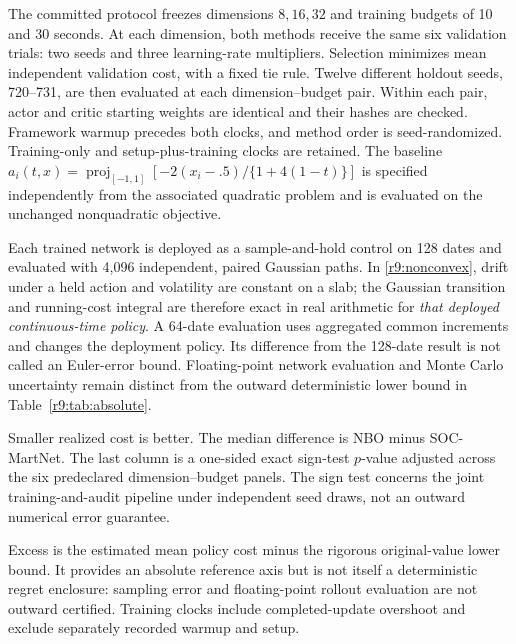The committed protocol freezes dimensions $8,16,32$ and training budgets of 10 and 30 seconds. At each dimension, both methods receive the same six validation trials: two seeds and three learning-rate multipliers. Selection minimizes mean independent validation cost, with a fixed tie rule. Twelve different holdout seeds, 720--731, are then evaluated at each dimension--budget pair. Within each pair, actor and critic starting weights are identical and their hashes are checked. Framework warmup precedes both clocks, and method order is seed-randomized. Training-only and setup-plus-training clocks are retained. The baseline $a_i(t,x)=\operatorname{proj}_{[-1,1]}[-2(x_i-.5)/\{1+4(1-t)\}]$ is specified independently from the associated quadratic problem and is evaluated on the unchanged nonquadratic objective.

Each trained network is deployed as a sample-and-hold control on 128 dates and evaluated with 4,096 independent, paired Gaussian paths. In \eqref{r9:nonconvex}, drift under a held action and volatility are constant on a slab; the Gaussian transition and running-cost integral are therefore exact in real arithmetic for \emph{that deployed continuous-time policy}. A 64-date evaluation uses aggregated common increments and changes the deployment policy. Its difference from the 128-date result is not called an Euler-error bound. Floating-point network evaluation and Monte Carlo uncertainty remain distinct from the outward deterministic lower bound in Table~\ref{r9:tab:absolute}.


\begin{table}[t]\centering\scriptsize
\caption{Frozen holdout comparison: twelve seed pairs per panel}\label{r9:tab:external}

\par\smallskip\footnotesize Smaller realized cost is better. The median difference is NBO minus SOC-MartNet. The last column is a one-sided exact sign-test $p$-value adjusted across the six predeclared dimension--budget panels. The sign test concerns the joint training-and-audit pipeline under independent seed draws, not an outward numerical error guarantee.
\end{table}
\begin{table}[t]\centering\scriptsize
\caption{Absolute reference excess and actual training clocks}\label{r9:tab:externalabsolute}

\par\smallskip\footnotesize Excess is the estimated mean policy cost minus the rigorous original-value lower bound. It provides an absolute reference axis but is not itself a deterministic regret enclosure: sampling error and floating-point rollout evaluation are not outward certified. Training clocks include completed-update overshoot and exclude separately recorded warmup and setup.
\end{table}


